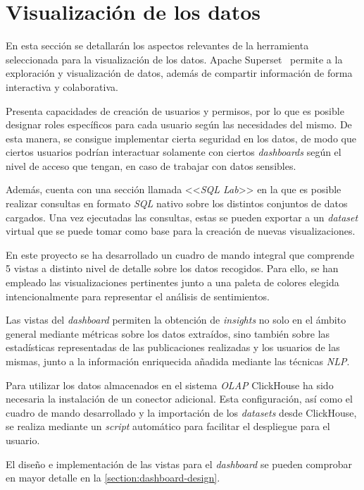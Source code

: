 \section{Visualización de los datos}

En esta sección se detallarán los aspectos relevantes de la herramienta seleccionada para la visualización de los datos. Apache Superset~\cite{apacheSuperset} permite a la exploración y visualización de datos, además de compartir información de forma interactiva y colaborativa.

Presenta capacidades de creación de usuarios y permisos, por lo que es posible designar roles específicos para cada usuario según las necesidades del mismo. De esta manera, se consigue implementar cierta seguridad en los datos, de modo que ciertos usuarios podrían interactuar solamente con ciertos \textit{dashboards} según el nivel de acceso que tengan, en caso de trabajar con datos sensibles.

Además, cuenta con una sección llamada <<\textit{SQL Lab}>> en la que es posible realizar consultas en formato \textit{SQL} nativo sobre los distintos conjuntos de datos cargados. Una vez ejecutadas las consultas, estas se pueden exportar a un \textit{dataset} virtual que se puede tomar como base para la creación de nuevas visualizaciones.

En este proyecto se ha desarrollado un cuadro de mando integral que comprende 5 vistas a distinto nivel de detalle sobre los datos recogidos. Para ello, se han empleado las visualizaciones pertinentes junto a una paleta de colores elegida intencionalmente para representar el análisis de sentimientos.

Las vistas del \textit{dashboard} permiten la obtención de \textit{insights} no solo en el ámbito general mediante métricas sobre los datos extraídos, sino también sobre las estadísticas representadas de las publicaciones realizadas y los usuarios de las mismas, junto a la información enriquecida añadida mediante las técnicas \textit{NLP}. 

Para utilizar los datos almacenados en el sistema \textit{OLAP} ClickHouse ha sido necesaria la instalación de un conector adicional. Esta configuración, así como el cuadro de mando desarrollado y la importación de los \textit{datasets} desde ClickHouse, se realiza mediante un \textit{script} automático para facilitar el despliegue para el usuario. 

El diseño e implementación de las vistas para el \textit{dashboard} se pueden comprobar en mayor detalle en la \autoref{section:dashboard-design}.


